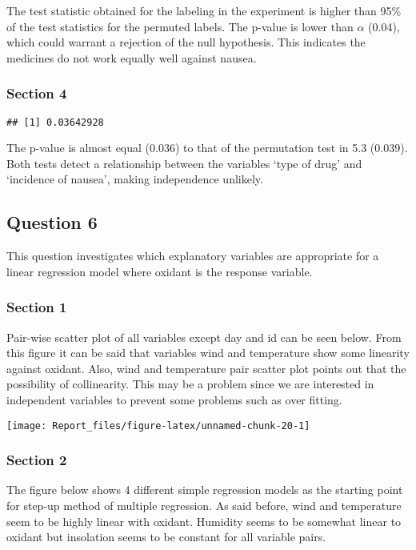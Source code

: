 \documentclass[]{article}
\begin{document}
The test statistic obtained for the labeling in the experiment is higher
than 95\% of the test statistics for the permuted labels. The p-value is
lower than \(\alpha\) (0.04), which could warrant a rejection of the
null hypothesis. This indicates the medicines do not work equally well
against nausea.

\subsubsection{Section 4}\label{section-4-2}

\begin{verbatim}
## [1] 0.03642928
\end{verbatim}

The p-value is almost equal (0.036) to that of the permutation test in
5.3 (0.039). Both tests detect a relationship between the variables
`type of drug' and `incidence of nausea', making independence unlikely.

\subsection{Question 6}\label{question-6}

This question investigates which explanatory variables are appropriate
for a linear regression model where oxidant is the response variable.

\subsubsection{Section 1}\label{section-1-3}

Pair-wise scatter plot of all variables except day and id can be seen
below. From this figure it can be said that variables wind and
temperature show some linearity against oxidant. Also, wind and
temperature pair scatter plot points out that the possibility of
collinearity. This may be a problem since we are interested in
independent variables to prevent some problems such as over fitting.

\begin{center}\texttt{[image: Report\_files/figure-latex/unnamed-chunk-20-1]} \end{center}

\subsubsection{Section 2}\label{section-2-3}

The figure below shows 4 different simple regression models as the
starting point for step-up method of multiple regression. As said
before, wind and temperature seem to be highly linear with oxidant.
Humidity seems to be somewhat linear to oxidant but insolation seems to
be constant for all variable pairs.
\end{document}
